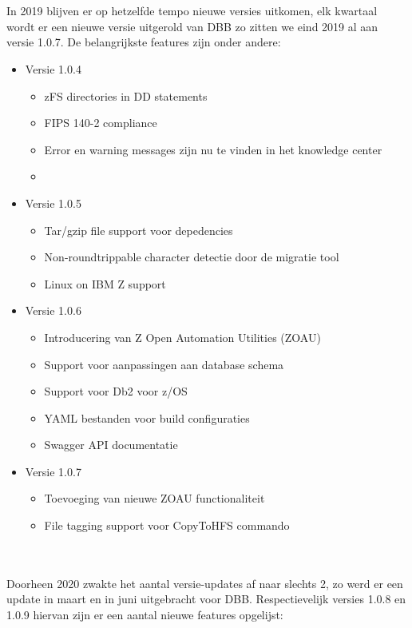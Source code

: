 \\ \\
In 2019 blijven er op hetzelfde tempo nieuwe versies uitkomen, elk kwartaal wordt er een nieuwe versie uitgerold van DBB zo zitten we eind 2019 al aan versie 1.0.7.
De belangrijkste features zijn onder andere:
\begin{itemize}
    \item Versie 1.0.4
    \begin{itemize}
        \item zFS directories in DD statements
        \item FIPS 140-2 compliance
        \item Error en warning messages zijn nu te vinden in het knowledge center
        \item
    \end{itemize}
    \item Versie 1.0.5
    \begin{itemize}
        \item Tar/gzip file support voor depedencies
        \item Non-roundtrippable character detectie door de migratie tool
        \item Linux on IBM Z support
    \end{itemize}
    \item Versie 1.0.6
    \begin{itemize}
        \item Introducering van Z Open Automation Utilities (ZOAU)
        \item Support voor aanpassingen aan database schema
        \item Support voor Db2 voor z/OS
        \item YAML bestanden voor build configuraties
        \item Swagger API documentatie
    \end{itemize}
    \item Versie 1.0.7
    \begin{itemize}
        \item Toevoeging van nieuwe ZOAU functionaliteit
        \item File tagging support voor CopyToHFS commando
    \end{itemize}
\end{itemize}
\\ \\
Doorheen 2020 zwakte het aantal versie-updates af naar slechts 2, zo werd er een update in maart en in juni uitgebracht voor DBB. Respectievelijk versies 1.0.8 en 1.0.9 hiervan zijn er een aantal nieuwe features opgelijst:
